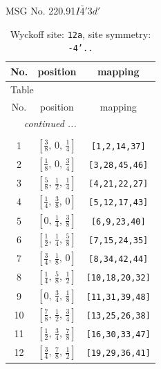 \documentclass[fleqn,8pt]{jsarticle}
\begin{document}
\setcounter{MaxMatrixCols}{32}

\renewcommand{\tablename}{Table~}
\renewcommand{\figurename}{Figure~}
\begin{center}
\LARGE
MSG No. 220.91\quad$I\bar{4}'3d'$
\end{center}
\renewcommand{\arraystretch}{1.2}
\begin{longtable}{ccc}
\caption{Wyckoff site: {\tt 12a}, site symmetry: {\tt -4'..}}
 \\
 \hline \hline
No. & position & mapping \\ \hline \endfirsthead

\multicolumn{2}{l}{\tablename\ \thetable{}} \\
 \hline \hline
No. & position & mapping \\ \hline \endhead

 \hline \hline
\multicolumn{2}{r}{\footnotesize\it continued ...} \\ \endfoot

 \hline \hline
\multicolumn{2}{r}{} \\ \endlastfoot

1 & $\left[ \frac{3}{8},\, 0,\, \frac{1}{4} \right]$ & {\tt [1,2,14,37]} \\ \hline
2 & $\left[ \frac{1}{8},\, 0,\, \frac{3}{4} \right]$ & {\tt [3,28,45,46]} \\ \hline
3 & $\left[ \frac{5}{8},\, \frac{1}{2},\, \frac{1}{4} \right]$ & {\tt [4,21,22,27]} \\ \hline
4 & $\left[ \frac{1}{4},\, \frac{3}{8},\, 0 \right]$ & {\tt [5,12,17,43]} \\ \hline
5 & $\left[ 0,\, \frac{1}{4},\, \frac{3}{8} \right]$ & {\tt [6,9,23,40]} \\ \hline
6 & $\left[ \frac{1}{2},\, \frac{1}{4},\, \frac{5}{8} \right]$ & {\tt [7,15,24,35]} \\ \hline
7 & $\left[ \frac{3}{4},\, \frac{1}{8},\, 0 \right]$ & {\tt [8,34,42,44]} \\ \hline
8 & $\left[ \frac{1}{4},\, \frac{5}{8},\, \frac{1}{2} \right]$ & {\tt [10,18,20,32]} \\ \hline
9 & $\left[ 0,\, \frac{3}{4},\, \frac{1}{8} \right]$ & {\tt [11,31,39,48]} \\ \hline
10 & $\left[ \frac{7}{8},\, \frac{1}{2},\, \frac{3}{4} \right]$ & {\tt [13,25,26,38]} \\ \hline
11 & $\left[ \frac{1}{2},\, \frac{3}{4},\, \frac{7}{8} \right]$ & {\tt [16,30,33,47]} \\ \hline
12 & $\left[ \frac{3}{4},\, \frac{7}{8},\, \frac{1}{2} \right]$ & {\tt [19,29,36,41]} \\
\end{longtable}
\end{document}
